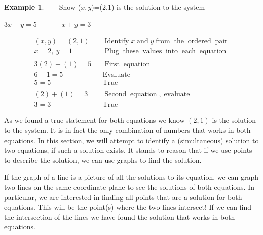 \documentclass[12pt]{book}
\theoremstyle{definition}
\newtheorem{example}{Example}
\newcommand{\tmop}[1]{\ensuremath{\operatorname{#1}}}
\begin{document}
\begin{example}~~~
  Show ($x,y$)=(2,1) is the solution to the system
\begin{center}
   $ 3 x - y = 5$~~~~~~~$x + y = 3$
\end{center}
	\begin{eqnarray*}
    (x,y)=(2, 1) &  & \tmop{Identify} x \tmop{and} y \tmop{from} \tmop{the}
    \tmop{ordered} \tmop{pair}\\
    x = 2,~y = 1 &  & \tmop{Plug} \tmop{these} \tmop{values} \tmop{into}
    \tmop{each} \tmop{equation}\\
    &  & \\
    3 (2) - (1) = 5 &  & \tmop{First} \tmop{equation}\\
    6 - 1 = 5 &  & \tmop{Evaluate}\\
    5 = 5 &  & \tmop{True}\\
    &  & \\
    (2) + (1) = 3 &  & \tmop{Second} \tmop{equation}, \tmop{evaluate}\\
    3 = 3 &  & \tmop{True}
  \end{eqnarray*}
\end{example}
As we found a true statement for both equations we know $(2,1)$ is the solution to the system. It is in fact the only combination of numbers that works in both equations.  In this section, we will attempt to identify a (simultaneous) solution to two equations, if such a solution exists.  It stands to reason that if we use points to describe the solution, we can use graphs to find the solution.\par
If the graph of a line is a picture of all the solutions to its equation, we can graph two lines on the same coordinate plane to see the solutions of both equations. In particular, we are interested in finding all points that are a solution for both equations.  This will be
the point(s) where the two lines intersect! If we can find the intersection of the lines we have found the solution that works in both equations.
\end{document}
